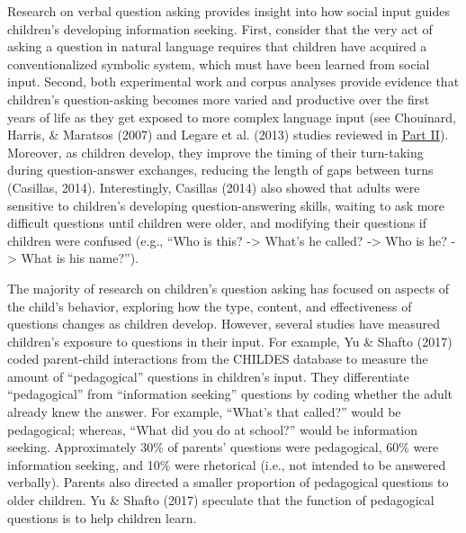 \documentclass[oneside]{report}
\begin{document}
Research on verbal question asking provides insight into how social
input guides children's developing information seeking. First, consider
that the very act of asking a question in natural language requires that
children have acquired a conventionalized symbolic system, which must
have been learned from social input. Second, both experimental work and
corpus analyses provide evidence that children's question-asking becomes
more varied and productive over the first years of life as they get
exposed to more complex language input (see Chouinard, Harris, \&
Maratsos (2007) and Legare et al. (2013) studies reviewed in
\protect\hyperlink{p2}{Part II}). Moreover, as children develop, they
improve the timing of their turn-taking during question-answer
exchanges, reducing the length of gaps between turns (Casillas, 2014).
Interestingly, Casillas (2014) also showed that adults were sensitive to
children's developing question-answering skills, waiting to ask more
difficult questions until children were older, and modifying their
questions if children were confused (e.g., ``Who is this?
-\textgreater{} What's he called? -\textgreater{} Who is he?
-\textgreater{} What is his name?'').

The majority of research on children's question asking has focused on
aspects of the child's behavior, exploring how the type, content, and
effectiveness of questions changes as children develop. However, several
studies have measured children's exposure to questions in their input.
For example, Yu \& Shafto (2017) coded parent-child interactions from
the CHILDES database to measure the amount of ``pedagogical'' questions
in children's input. They differentiate ``pedagogical'' from
``information seeking'' questions by coding whether the adult already
knew the answer. For example, ``What's that called?'' would be
pedagogical; whereas, ``What did you do at school?'' would be
information seeking. Approximately 30\% of parents' questions were
pedagogical, 60\% were information seeking, and 10\% were rhetorical
(i.e., not intended to be answered verbally). Parents also directed a
smaller proportion of pedagogical questions to older children. Yu \&
Shafto (2017) speculate that the function of pedagogical questions is to
help children learn.
\end{document}
